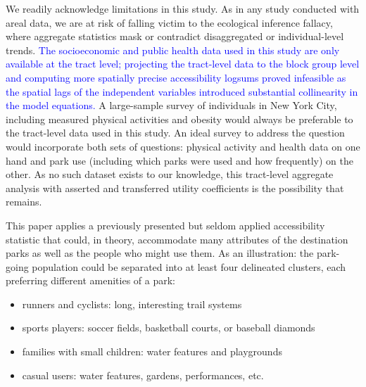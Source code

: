 \documentclass[shortAfour,sageh.bst]{sagej}
\begin{document}
We readily acknowledge limitations in this study. As in any study
conducted with areal data, we are at risk of falling victim to the
ecological inference fallacy, where aggregate statistics mask or
contradict disaggregated or individual-level trends. \textcolor{blue}{The socioeconomic
and public health data used in this study are only available at the
tract level; projecting the tract-level data to the block group level
and computing more spatially precise accessibility logsums proved
infeasible as the spatial lags of the independent variables introduced
substantial collinearity in the model equations.} A large-sample survey
of individuals in New York City, including measured physical activities
and obesity would always be preferable to the tract-level data used in
this study. An ideal survey to address the question would incorporate
both sets of questions: physical activity and health data on one hand
and park use (including which parks were used and how frequently) on the
other. As no such dataset exists to our knowledge, this tract-level
aggregate analysis with asserted and transferred utility coefficients is
the possibility that remains.

This paper applies a previously presented but seldom applied
accessibility statistic that could, in theory, accommodate many
attributes of the destination parks as well as the people who might use
them. As an illustration: the park-going population could be separated
into at least four delineated clusters, each preferring different
amenities of a park:

\begin{itemize}
 \item{runners and cyclists: long, interesting trail systems}
 \item{sports players: soccer fields, basketball courts, or baseball diamonds}
 \item{families with small children: water features and playgrounds}
 \item{casual users: water features, gardens, performances, etc.}
\end{itemize}
\end{document}

